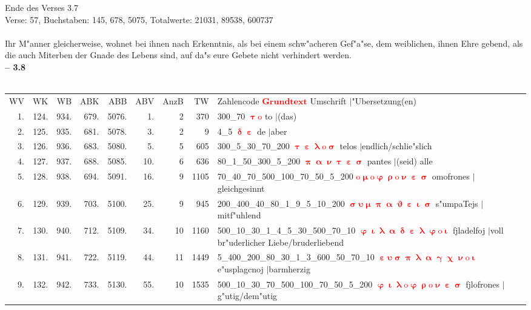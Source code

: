 \documentclass[a4paper,10pt,landscape]{article}
\begin{document}
Ende des Verses 3.7\\
Verse: 57, Buchstaben: 145, 678, 5075, Totalwerte: 21031, 89538, 600737\\
\\
Ihr M"anner gleicherweise, wohnet bei ihnen nach Erkenntnis, als bei einem schw"acheren Gef"a"se, dem weiblichen, ihnen Ehre gebend, als die auch Miterben der Gnade des Lebens sind, auf da"s eure Gebete nicht verhindert werden.\\
{\bf -- 3.8}\\
\medskip \\
\begin{tabular}{rrrrrrrrp{120mm}}
WV&WK&WB&ABK&ABB&ABV&AnzB&TW&Zahlencode \textcolor{red}{$\boldsymbol{Grundtext}$} Umschrift $|$"Ubersetzung(en)\\
1.&124.&934.&679.&5076.&1.&2&370&300\_70 \textcolor{red}{$\boldsymbol{\uptau\mathrm{o}}$} to $|$(das)\\
2.&125.&935.&681.&5078.&3.&2&9&4\_5 \textcolor{red}{$\boldsymbol{\updelta\upepsilon}$} de $|$aber\\
3.&126.&936.&683.&5080.&5.&5&605&300\_5\_30\_70\_200 \textcolor{red}{$\boldsymbol{\uptau\upepsilon\uplambda\mathrm{o}\upsigma}$} telos $|$endlich/schlie"slich\\
4.&127.&937.&688.&5085.&10.&6&636&80\_1\_50\_300\_5\_200 \textcolor{red}{$\boldsymbol{\uppi\upalpha\upnu\uptau\upepsilon\upsigma}$} pantes $|$(seid) alle\\
5.&128.&938.&694.&5091.&16.&9&1105&70\_40\_70\_500\_100\_70\_50\_5\_200 \textcolor{red}{$\boldsymbol{\mathrm{o}\upmu\mathrm{o}\upvarphi\uprho\mathrm{o}\upnu\upepsilon\upsigma}$} omofrones $|$gleichgesinnt\\
6.&129.&939.&703.&5100.&25.&9&945&200\_400\_40\_80\_1\_9\_5\_10\_200 \textcolor{red}{$\boldsymbol{\upsigma\upsilon\upmu\uppi\upalpha\upvartheta\upepsilon\upiota\upsigma}$} s"umpaTejs $|$mitf"uhlend\\
7.&130.&940.&712.&5109.&34.&10&1160&500\_10\_30\_1\_4\_5\_30\_500\_70\_10 \textcolor{red}{$\boldsymbol{\upvarphi\upiota\uplambda\upalpha\updelta\upepsilon\uplambda\upvarphi\mathrm{o}\upiota}$} fjladelfoj $|$voll br"uderlicher Liebe/bruderliebend\\
8.&131.&941.&722.&5119.&44.&11&1449&5\_400\_200\_80\_30\_1\_3\_600\_50\_70\_10 \textcolor{red}{$\boldsymbol{\upepsilon\upsilon\upsigma\uppi\uplambda\upalpha\upgamma\upchi\upnu\mathrm{o}\upiota}$} e"usplagcnoj $|$barmherzig\\
9.&132.&942.&733.&5130.&55.&10&1535&500\_10\_30\_70\_500\_100\_70\_50\_5\_200 \textcolor{red}{$\boldsymbol{\upvarphi\upiota\uplambda\mathrm{o}\upvarphi\uprho\mathrm{o}\upnu\upepsilon\upsigma}$} fjlofrones $|$g"utig/dem"utig\\
\end{tabular}\medskip \\
\end{document}
